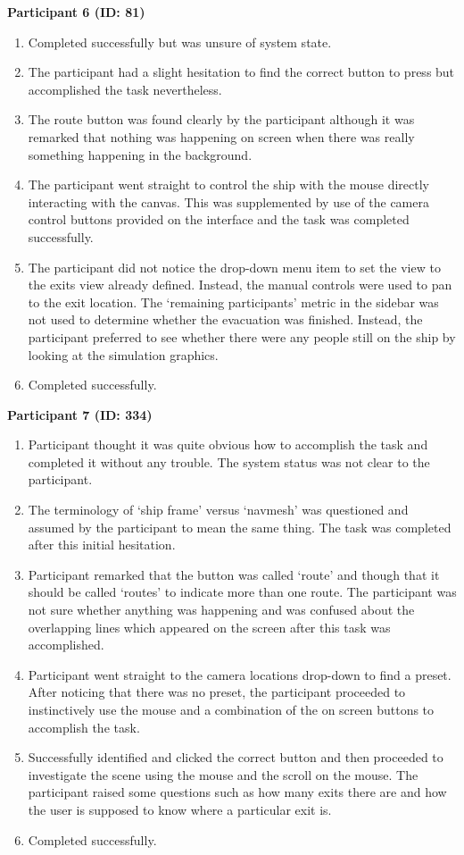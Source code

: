\textbf{Participant 6 (ID: 81)}
\begin{enumerate}
\item Completed successfully but was unsure of system state.
\item The participant had a slight hesitation to find the correct button to press but accomplished the task nevertheless.
\item The route button was found clearly by the participant although it was remarked that nothing was happening on screen when there was really something happening in the background.
\item The participant went straight to control the ship with the mouse directly interacting with the canvas. This was supplemented by use of the camera control buttons provided on the interface and the task was completed successfully.
\item The participant did not notice the drop-down menu item to set the view to the exits view already defined. Instead, the manual controls were used to pan to the exit location. The ‘remaining participants’ metric in the sidebar was not used to determine whether the evacuation was finished. Instead, the participant preferred to see whether there were any people still on the ship by looking at the simulation graphics.
\item Completed successfully.
\end{enumerate}

\textbf{Participant 7 (ID: 334)}
\begin{enumerate}
\item Participant thought it was quite obvious how to accomplish the task and completed it without any trouble. The system status was not clear to the participant.
\item The terminology of ‘ship frame’ versus ‘navmesh’ was questioned and assumed by the participant to mean the same thing. The task was completed after this initial hesitation.
\item Participant remarked that the button was called ‘route’ and though that it should be called ‘routes’ to indicate more than one route. The participant was not sure whether anything was happening and was confused about the overlapping lines which appeared on the screen after this task was accomplished.
\item Participant went straight to the camera locations drop-down to find a preset. After noticing that there was no preset, the participant proceeded to instinctively use the mouse and a combination of the on screen buttons to accomplish the task.
\item Successfully identified and clicked the correct button and then proceeded to investigate the scene using the mouse and the scroll on the mouse. The participant raised some questions such as how many exits there are and how the user is supposed to know where a particular exit is.
\item Completed successfully.
\end{enumerate}

